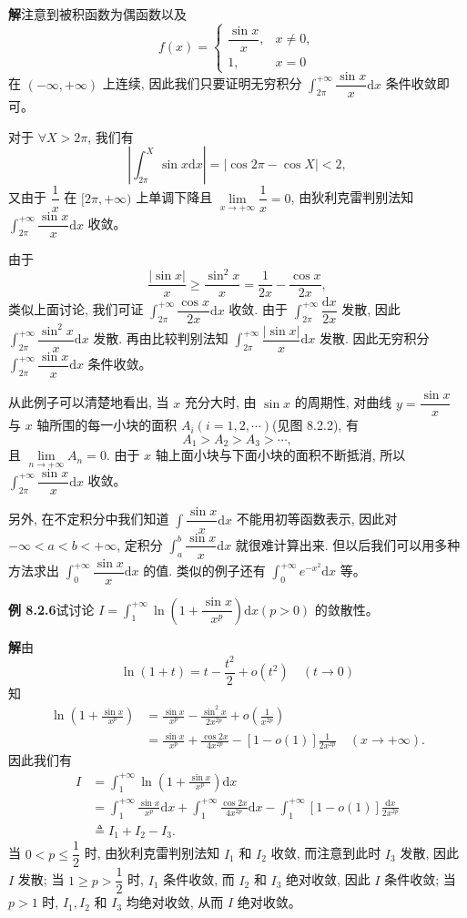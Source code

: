 \documentclass[UTF8, 12pt, fontset=fandol, oneside]{ctexart}
\begin{document}
\noindent\textbf{解}\quad 注意到被积函数为偶函数以及
\[
  f(x)=
  \begin{cases}
    \dfrac{\sin x}{x}, & x\ne0,\\
    1, & x=0
  \end{cases}
\]
在 $(-\infty,+\infty)$ 上连续, 因此我们只要证明无穷积分 $\int_{2\pi}^{+\infty}\dfrac{\sin x}{x}\mathrm dx$ 条件收敛即可。

对于 $\forall X>2\pi$, 我们有
\[
  \left|\int_{2\pi}^X\sin x\mathrm dx\right|
  =
  |\cos2\pi-\cos X|<2,
\]
又由于 $\dfrac1x$ 在 $[2\pi,+\infty)$ 上单调下降且 $\lim\limits_{x\to+\infty}\dfrac1x=0$, 由狄利克雷判别法知 $\int_{2\pi}^{+\infty}\dfrac{\sin x}{x}\mathrm dx$ 收敛。

由于
\[
  \frac{|\sin x|}{x}\geq \frac{\sin^2x}{x}=\frac1{2x}-\frac{\cos x}{2x},
\]
类似上面讨论, 我们可证 $\int_{2\pi}^{+\infty}\dfrac{\cos x}{2x}\mathrm dx$ 收敛. 由于 $\int_{2\pi}^{+\infty}\dfrac{\mathrm dx}{2x}$ 发散, 因此 $\int_{2\pi}^{+\infty}\dfrac{\sin^2x}{x}\mathrm dx$ 发散. 再由比较判别法知 $\int_{2\pi}^{+\infty}\dfrac{|\sin x|}{x}\mathrm dx$ 发散. 因此无穷积分 $\int_{2\pi}^{+\infty}\dfrac{\sin x}{x}\mathrm dx$ 条件收敛。

从此例子可以清楚地看出, 当 $x$ 充分大时, 由 $\sin x$ 的周期性, 对曲线 $y=\dfrac{\sin x}{x}$ 与 $x$ 轴所围的每一小块的面积 $A_i(i=1,2,\cdots)$(见图 8.2.2), 有
\[
  A_1>A_2>A_3>\cdots,
\]
且 $\lim\limits_{n\to+\infty}A_n=0$. 由于 $x$ 轴上面小块与下面小块的面积不断抵消, 所以 $\int_{2\pi}^{+\infty}\dfrac{\sin x}{x}\mathrm dx$ 收敛。

另外, 在不定积分中我们知道 $\int\dfrac{\sin x}{x}\mathrm dx$ 不能用初等函数表示, 因此对 $-\infty<a<b<+\infty$, 定积分 $\int_a^b\dfrac{\sin x}{x}\mathrm dx$ 就很难计算出来. 但以后我们可以用多种方法求出 $\int_0^{+\infty}\dfrac{\sin x}{x}\mathrm dx$ 的值. 类似的例子还有 $\int_0^{+\infty}e^{-x^2}\mathrm dx$ 等。

\noindent\textbf{例 8.2.6}\quad 试讨论 $I=\int_1^{+\infty}\ln\left(1+\dfrac{\sin x}{x^p}\right)\mathrm dx(p>0)$ 的敛散性。

\noindent\textbf{解}\quad 由
\[
  \ln(1+t)=t-\frac{t^2}{2}+o(t^2)\quad(t\to0)
\]
知
\[
\begin{aligned}
  \ln\left(1+\frac{\sin x}{x^p}\right)
  &=
  \frac{\sin x}{x^p}
  -
  \frac{\sin^2x}{2x^{2p}}
  +
  o\left(\frac1{x^{2p}}\right)\\
  &=
  \frac{\sin x}{x^p}
  +
  \frac{\cos2x}{4x^{2p}}
  -
  [1-o(1)]\frac1{2x^{2p}}
  \quad(x\to+\infty).
\end{aligned}
\]
因此我们有
\[
\begin{aligned}
  I
  &=
  \int_1^{+\infty}\ln\left(1+\frac{\sin x}{x^p}\right)\mathrm dx\\
  &=
  \int_1^{+\infty}\frac{\sin x}{x^p}\mathrm dx
  +
  \int_1^{+\infty}\frac{\cos2x}{4x^{2p}}\mathrm dx
  -
  \int_1^{+\infty}[1-o(1)]\frac{\mathrm dx}{2x^{2p}}\\
  &\triangleq I_1+I_2-I_3.
\end{aligned}
\]
当 $0<p\leq\dfrac12$ 时, 由狄利克雷判别法知 $I_1$ 和 $I_2$ 收敛, 而注意到此时 $I_3$ 发散, 因此 $I$ 发散; 当 $1\geq p>\dfrac12$ 时, $I_1$ 条件收敛, 而 $I_2$ 和 $I_3$ 绝对收敛, 因此 $I$ 条件收敛; 当 $p>1$ 时, $I_1,I_2$ 和 $I_3$ 均绝对收敛, 从而 $I$ 绝对收敛。
\end{document}
